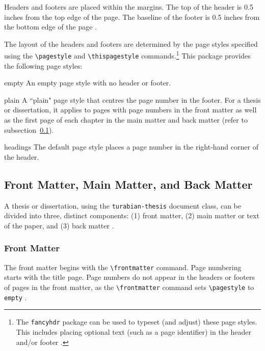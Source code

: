 \documentclass{article}
\newcommand{\textcmd}[1]{\texttt{\textbackslash #1}}
\newenvironment{pagestyleoptions}
	{\list{}{%
		\setlength\topsep{0in}
		\setlength\itemsep{1\baselineskip}
		\setlength\parsep{0pt}
		\setlength\labelwidth{0.75in}
		\setlength\leftmargin{1in}
		\setlength\listparindent{0in}
		\setlength\itemindent{0in}
		\setlength\labelsep{0pt}
		\let\makelabel\pagestylelabel}
		\singlespacing}
	{\endlist}
\newcommand*{\pagestylelabel}[1]{\parbox[t]{\labelwidth}{\normalfont \texttt{#1}}}
\begin{document}
Headers and footers are placed within the margins. The top of the header is 0.5 inches from the top edge of the page. The baseline of the footer is 0.5 inches from the bottom edge of the page \autocite[372, 374]{turabian_manual_2013}.

The layout of the headers and footers are determined by the page styles specified using the \textcmd{pagestyle} and \textcmd{thispagestyle} commands.\footnote{%
	The \texttt{fancyhdr} package can be used to typeset (and adjust) these page styles. This includes placing optional text (such as a page identifier) in the header and/or footer \autocite[374]{turabian_manual_2013}.}
This package provides the following page styles:

\begin{pagestyleoptions}
	\item[empty] An empty page style with no header or footer.

	\item[plain] A ``plain" page style that centres the page number in the footer. For a thesis or dissertation, it applies to pages with page numbers in the front matter as well as the first page of each chapter in the main matter and back matter (refer to subsection~\ref{subsec:td_structure}).

	\item[headings] The default page style places a page number in the right-hand corner of the header.
\end{pagestyleoptions}


\subsection{Front Matter, Main Matter, and Back Matter}
\label{subsec:td_structure}

A thesis or dissertation, using the \texttt{turabian-thesis} document class, can be divided into three, distinct components: (1) front matter, (2) main matter or text of the paper, and (3) back matter \autocite[375]{turabian_manual_2013}.

\subsubsection*{Front Matter}

The front matter begins with the \textcmd{frontmatter} command. Page numbering starts with the title page. Page numbers do not appear in the headers or footers of pages in the front matter, as the \textcmd{frontmatter} command sets \textcmd{pagestyle} to \texttt{empty} \autocite[373--374, 376]{turabian_manual_2013}.
\end{document}
